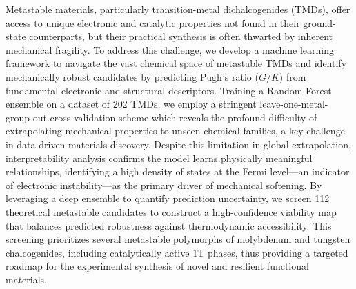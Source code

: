 \documentclass[]{article}
\begin{document}
Metastable materials, particularly transition-metal dichalcogenides (TMDs), offer access to unique electronic and catalytic properties not found in their ground-state counterparts, but their practical synthesis is often thwarted by inherent mechanical fragility. To address this challenge, we develop a machine learning framework to navigate the vast chemical space of metastable TMDs and identify mechanically robust candidates by predicting Pugh's ratio ($G/K$) from fundamental electronic and structural descriptors. Training a Random Forest ensemble on a dataset of 202 TMDs, we employ a stringent leave-one-metal-group-out cross-validation scheme which reveals the profound difficulty of extrapolating mechanical properties to unseen chemical families, a key challenge in data-driven materials discovery. Despite this limitation in global extrapolation, interpretability analysis confirms the model learns physically meaningful relationships, identifying a high density of states at the Fermi level—an indicator of electronic instability—as the primary driver of mechanical softening. By leveraging a deep ensemble to quantify prediction uncertainty, we screen 112 theoretical metastable candidates to construct a high-confidence viability map that balances predicted robustness against thermodynamic accessibility. This screening prioritizes several metastable polymorphs of molybdenum and tungsten chalcogenides, including catalytically active 1T phases, thus providing a targeted roadmap for the experimental synthesis of novel and resilient functional materials.
\end{document}
